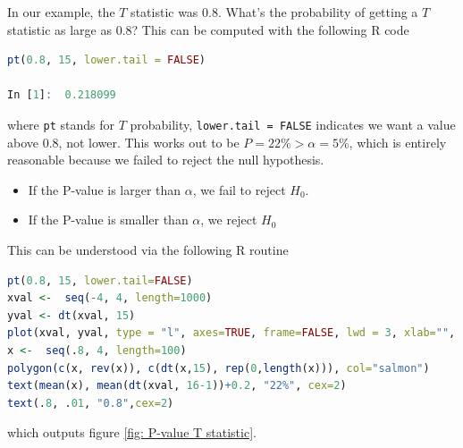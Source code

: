 \documentclass{homework}
\begin{document}
In our example, the $T$ statistic was $0.8$. What's the probability of getting a $T$ statistic as large as $0.8$? This can be computed with the following R code 

\begin{lstlisting}[language=R]
pt(0.8, 15, lower.tail = FALSE) 

In [1]:  0.218099
\end{lstlisting}

where \texttt{pt} stands for $T$ probability, \texttt{lower.tail = FALSE} indicates we want a value above $0.8$, not lower. This works out to be $P = 22\% > \alpha = 5\%$, which is entirely reasonable because we failed to reject the null hypothesis. 

\begin{itemize}
    \item If the P-value is larger than $\alpha$, we fail to reject $H_0$. 
    \item If the P-value is smaller than $\alpha$, we reject $H_0$
\end{itemize}

This can be understood via the following R routine 

\begin{lstlisting}[language=R]
pt(0.8, 15, lower.tail=FALSE)
xval <-  seq(-4, 4, length=1000)
yval <- dt(xval, 15)
plot(xval, yval, type = "l", axes=TRUE, frame=FALSE, lwd = 3, xlab="", ylab= "")
x <-  seq(.8, 4, length=100)
polygon(c(x, rev(x)), c(dt(x,15), rep(0,length(x))), col="salmon")
text(mean(x), mean(dt(xval, 16-1))+0.2, "22%", cex=2)
text(.8, .01, "0.8",cex=2)
\end{lstlisting}

which outputs figure \ref{fig: P-value T statistic}.
\end{document}
